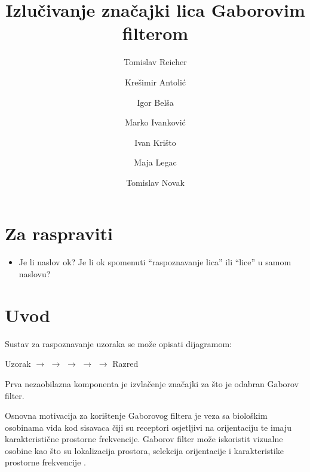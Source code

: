\documentclass{article}
\begin{document}
\title{Izlučivanje značajki lica Gaborovim filterom}
\author{Tomislav Reicher \and Krešimir Antolić \and Igor Belša \and Marko Ivanković \and Ivan Krišto \and Maja Legac \and Tomislav Novak}

\maketitle

\tableofcontents

\section*{Za raspraviti}
\begin{itemize}
  \item Je li naslov ok? Je li ok spomenuti ``raspoznavanje lica'' ili ``lice''
  u samom naslovu?
\end{itemize}

\section{Uvod}
Sustav za raspoznavanje uzoraka se može opisati dijagramom:
\begin{center}
Uzorak $\rightarrow$  $\rightarrow$  $\rightarrow$  $\rightarrow$
 $\rightarrow$ Razred
\end{center}
Prva nezaobilazna komponenta je izvlačenje značajki za što je odabran Gaborov
filter.

Osnovna motivacija za korištenje Gaborovog filtera je veza sa biološkim osobinama
vida kod sisavaca čiji su receptori osjetljivi na orijentaciju te imaju
karakteristične prostorne frekvencije. Gaborov filter može iskoristit vizualne
osobine kao što su lokalizacija prostora, selekcija orijentacije i karakteristike
prostorne frekvencije
\citep{bhuiyan2007onfacerecognition}\nocite{daugman1985uncertainty}.
\end{document}
